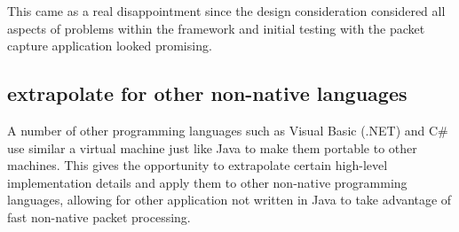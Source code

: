 \documentclass[final_report.tex]{subfiles}
\begin{document}
This came as a real disappointment since the design consideration considered all aspects of problems within the framework and initial testing with the packet capture application looked promising.


\subsection{extrapolate for other non-native languages}
A number of other programming languages such as Visual Basic (.NET) and C\# use similar a virtual machine just like Java to make them portable to other machines. This gives the opportunity to extrapolate certain high-level implementation details and apply them to other non-native programming languages, allowing for other application not written in Java to take advantage of fast non-native packet processing. 
\end{document}
